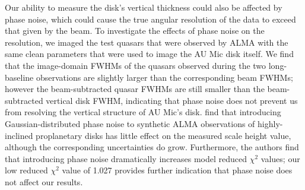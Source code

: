 \documentclass[modern]{aastex62}
\begin{document}
Our ability to measure the disk's vertical thickness could also be affected by phase noise, which could cause the true angular resolution of the data to exceed that given by the beam.
To investigate the effects of phase noise on the resolution, we imaged the test quasars that were observed by ALMA with the same clean parameters that were used to image the AU Mic disk itself.
We find that the image-domain FWHMs of the quasars observed during the two long-baseline observations are slightly larger than the corresponding beam FWHMs; however the beam-subtracted quasar FWHMs are still smaller than the beam-subtracted vertical disk FWHM, indicating that phase noise does not prevent us from resolving the vertical structure of AU Mic's disk.
\citet{boehler13} find that introducing Gaussian-distributed phase noise to synthetic ALMA observations of highly-inclined proplanetary disks has little effect on the measured scale height value, although the corresponding uncertainties do grow.
Furthermore, the authors find that introducing phase noise dramatically increases model reduced $\chi^2$ values; our low reduced $\chi^2$ value of 1.027 provides further indication that phase noise does not affect our results.
\end{document}
